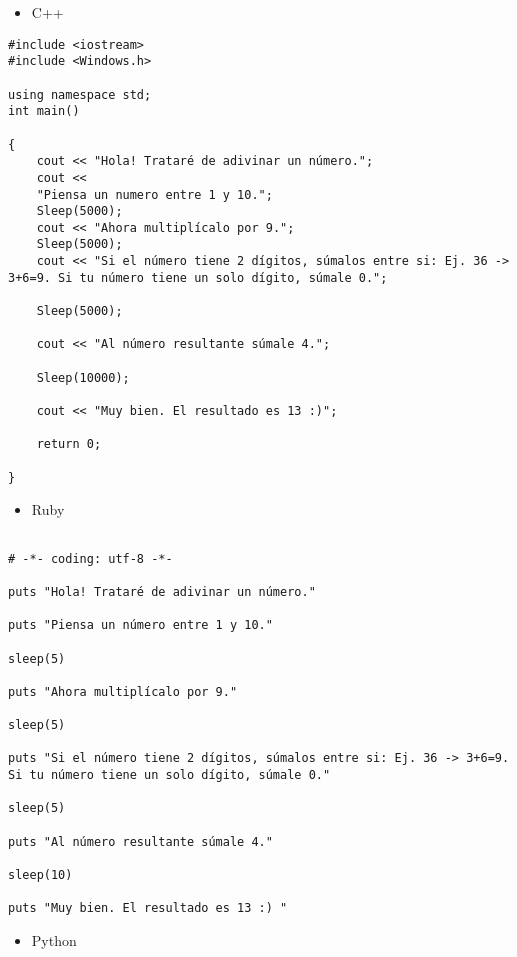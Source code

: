 \documentclass{article}
\begin{document}
\begin{itemize}
\item C++
\end{itemize}

\begin{verbatim}
#include <iostream>
#include <Windows.h>

using namespace std;
int main()

{   
	cout << "Hola! Trataré de adivinar un número.";
	cout <<
	"Piensa un numero entre 1 y 10.";
	Sleep(5000);
	cout << "Ahora multiplícalo por 9.";
	Sleep(5000);
	cout << "Si el número tiene 2 dígitos, súmalos entre si: Ej. 36 -> 3+6=9. Si tu número tiene un solo dígito, súmale 0.";

	Sleep(5000);

	cout << "Al número resultante súmale 4.";

	Sleep(10000);

	cout << "Muy bien. El resultado es 13 :)";

	return 0;

}

\end{verbatim}

\begin{itemize}
\item Ruby
\end{itemize}

\begin{verbatim}

# -*- coding: utf-8 -*-

puts "Hola! Trataré de adivinar un número."

puts "Piensa un número entre 1 y 10."

sleep(5)  

puts "Ahora multiplícalo por 9."

sleep(5)

puts "Si el número tiene 2 dígitos, súmalos entre si: Ej. 36 -> 3+6=9. Si tu número tiene un solo dígito, súmale 0."

sleep(5) 

puts "Al número resultante súmale 4."

sleep(10) 

puts "Muy bien. El resultado es 13 :) "

\end{verbatim}

\begin{itemize}
\item Python
\end{itemize}
\end{document}
